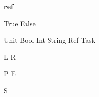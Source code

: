 


\newcommand*{\If}[3]
  {\textbf{if}\,#1\,\textbf{then}\,#2\,\textbf{else}\,#3\,}
\newoperator{\Ref}
  {\textbf{ref}}



\newoperator{\True}
  {\textsf{True}}
\newoperator{\False}
  {\textsf{False}}

\newcommand*{\astring}[1]
  {\textit{``#1''}}



\newoperator{\Unit}
  {\textsf{Unit}}
\newoperator{\Bool}
  {\textsf{Bool}}
\newoperator{\Int}
  {\textsf{Int}}
\newoperator{\String}
  {\textsf{String}}
\newoperator{\Reference}
  {\textsf{Ref}}
\newoperator{\Task}
  {\textsf{Task}}



\newoperator{\Then}
  {\vartriangleright}
\newoperator{\When}
  {\blacktriangleright}
\let\And\relax
\newoperator{\And}
  {\otimes}
\newoperator{\Or}
  {\oplus}
\newoperator{\Edit}
  {\square}
\newoperator{\Empty}
  {\boxtimes}
\newoperator{\Watch}
  {\blacksquare}
\newoperator{\Fail}
  {\circlearrowleft}

\newoperator{\Both}
  {\odot}



\newoperator{\Left}
  {\textsf{L}}
\newoperator{\Right}
  {\textsf{R}}

\newcommand*{\Clear}
  {\textsf{C}}
\newcommand*{\Next}
  {\textsf{N}}
\newoperator{\Pick}
  {\textsf{P}}
\newoperator{\Execute}
  {\textsf{E}}


\newcommand*{\First}
  {\textsf{F}}
\newcommand*{\Second}
  {\textsf{S}}
\newoperator{\Other}
  {\textsf{S}}



\newcommand*{\downto}
  {\Downarrow}
\newcommand*{\normalise}
  {\;\rightarrow\!\shortmid\;}
\newcommand*{\handle}[1]
  {\;\xrightarrow{\;#1\;}\;}

\newcommand*{\Value}
  {\mathcal{V}}
